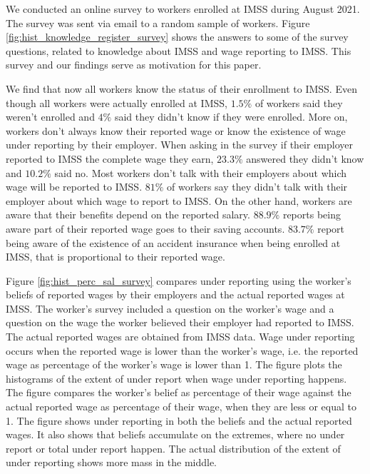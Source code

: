 \documentclass[oneside,11pt]{article}
\begin{document}
We conducted an online survey to workers enrolled at IMSS during August 2021. The survey was sent via email to a random sample of workers. Figure \ref{fig:hist_knowledge_register_survey} shows the answers to some of the survey questions, related to knowledge about IMSS and wage reporting to IMSS. This survey and our findings serve as motivation for this paper. 

We find that now all workers know the status of their enrollment to IMSS. Even though all workers were actually enrolled at IMSS, $1.5\%$ of workers said they weren't enrolled and $4\%$ said they didn't know if they were enrolled. More on, workers don't always know their reported wage or know the existence of wage under reporting by their employer. When asking in the survey if their employer reported to IMSS the complete wage they earn, $23.3\%$ answered they didn't know and $10.2\%$ said no. Most workers don't talk with their employers about which wage will be reported to IMSS. $81\%$ of workers say they didn't talk with their employer about which wage to report to IMSS. On the other hand, workers are aware that their benefits depend on the reported salary. $88.9\%$ reports being aware part of their reported wage goes to their saving accounts. $83.7\%$ report being aware of the existence of an accident insurance when being enrolled at IMSS, that is proportional to their reported wage.


Figure \ref{fig:hist_perc_sal_survey} compares under reporting using the worker's beliefs of reported wages by their employers and the actual reported wages at IMSS. The worker's survey included a question on the worker’s wage and a question on the wage the worker believed their employer had reported to IMSS. The actual reported wages are obtained from IMSS data. Wage under reporting occurs when the reported wage is lower than the worker’s wage, i.e. the reported wage as percentage of the worker's wage is lower than 1. The figure plots the histograms of the extent of under report when wage under reporting happens. The figure compares the worker’s belief as percentage of their wage against the actual reported wage as percentage of their wage, when they are less or equal to 1. The figure shows under reporting in both the beliefs and the actual reported wages. It also shows that beliefs accumulate on the extremes, where no under report or total under report happen. The actual distribution of the extent of under reporting shows more mass in the middle. 
\end{document}
